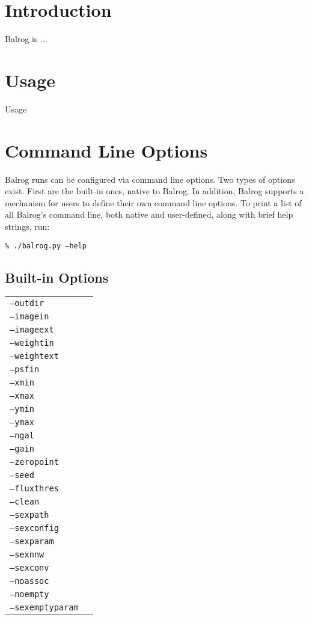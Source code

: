 \documentclass[12pt]{article}
\newcommand{\balrog}{Balrog}
\newcommand{\opt}[1]{\texttt{--#1}}
\newcommand{\bcmd}[1]{\texttt{\% ./balrog.py #1}}
\begin{document}
\balrogtitlepage

\newpage
\tableofcontents

\newpage
\section{Introduction}
\label{sec:intro}
\balrog{} is ...

\section{Usage}
Usage

\section{Command Line Options}
\balrog{} runs can be configured via command line options.
Two types of options exist. First are the built-in
ones, native to \balrog{}. In addition, \balrog{}
supports a mechanism for users to define their
own command line options.
To print a list of all \balrog{}'s command line,
both native and user-defined, along with
brief help strings, run:

\bcmd{\opt{help}}


\subsection{Built-in Options}
\begin{tabular}{ l p{10cm}}
\opt{outdir} & \\
\opt{imagein} & \\
\opt{imageext} & \\
\opt{weightin} & \\
\opt{weightext} & \\
\opt{psfin} &  \\
\opt{xmin} &  \\
\opt{xmax} &  \\
\opt{ymin} &  \\
\opt{ymax} &  \\
\opt{ngal} &  \\
\opt{gain} &  \\
\opt{zeropoint} &  \\
\opt{seed} &  \\
\opt{fluxthres} &  \\
\opt{clean} &  \\
\opt{sexpath} &  \\
\opt{sexconfig} &  \\
\opt{sexparam} &  \\
\opt{sexnnw} &  \\
\opt{sexconv} &  \\
\opt{noassoc} &  \\
\opt{noempty} &  \\
\opt{sexemptyparam} &
\end{tabular}
\end{document}
